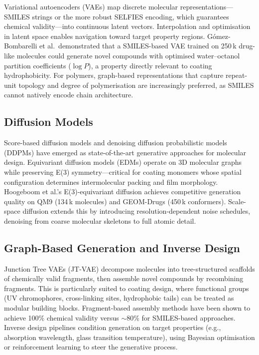 \documentclass[11pt,a4paper]{article}
\begin{document}
Variational autoencoders (VAEs) map discrete molecular representations---SMILES strings or the more robust SELFIES encoding, which guarantees chemical validity---into continuous latent vectors.
Interpolation and optimisation in latent space enables navigation toward target property regions.
Gómez-Bombarelli et al.\ demonstrated that a SMILES-based VAE trained on 250\,k drug-like molecules could generate novel compounds with optimised water--octanol partition coefficients ($\log P$), a property directly relevant to coating hydrophobicity.
For polymers, graph-based representations that capture repeat-unit topology and degree of polymerisation are increasingly preferred, as SMILES cannot natively encode chain architecture.

\subsection{Diffusion Models}

Score-based diffusion models and denoising diffusion probabilistic models (DDPMs) have emerged as state-of-the-art generative approaches for molecular design.
Equivariant diffusion models (EDMs) operate on 3D molecular graphs while preserving E(3) symmetry---critical for coating monomers whose spatial configuration determines intermolecular packing and film morphology.
Hoogeboom et al.'s E(3)-equivariant diffusion achieves competitive generation quality on QM9 (134\,k molecules) and GEOM-Drugs (450\,k conformers).
Scale-space diffusion extends this by introducing resolution-dependent noise schedules, denoising from coarse molecular skeletons to full atomic detail.

\subsection{Graph-Based Generation and Inverse Design}

Junction Tree VAEs (JT-VAE) decompose molecules into tree-structured scaffolds of chemically valid fragments, then assemble novel compounds by recombining fragments.
This is particularly suited to coating design, where functional groups (UV chromophores, cross-linking sites, hydrophobic tails) can be treated as modular building blocks.
Fragment-based assembly methods have been shown to achieve 100\% chemical validity versus $\sim$80\% for SMILES-based approaches.
Inverse design pipelines condition generation on target properties (e.g., absorption wavelength, glass transition temperature), using Bayesian optimisation or reinforcement learning to steer the generative process.
\end{document}
